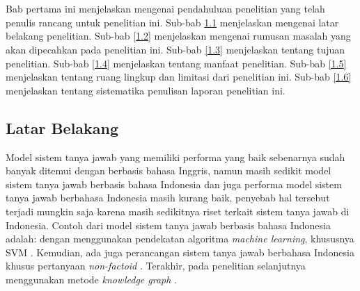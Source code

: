 \chapter{\babSatu}
\label{bab:1}
Bab pertama ini menjelaskan mengenai pendahuluan penelitian yang telah penulis rancang untuk penelitian ini. Sub-bab \ref{1.1} menjelaskan mengenai latar belakang penelitian. Sub-bab \ref{1.2} menjelaskan mengenai rumusan masalah yang akan dipecahkan pada penelitian ini. Sub-bab \ref{1.3} menjelaskan tentang tujuan penelitian. Sub-bab \ref{1.4} menjelaskan tentang manfaat penelitian. Sub-bab \ref{1.5} menjelaskan tentang ruang lingkup dan limitasi dari penelitian ini. Sub-bab \ref{1.6} menjelaskan tentang sistematika penulisan laporan penelitian ini.

\section{Latar Belakang}
\label{1.1}
Model sistem tanya jawab yang memiliki performa yang baik sebenarnya sudah banyak ditemui dengan berbasis bahasa Inggris, namun masih sedikit model sistem tanya jawab berbasis bahasa Indonesia dan juga performa model sistem tanya jawab berbahasa Indonesia masih kurang baik, penyebab hal tersebut terjadi mungkin saja karena masih sedikitnya riset terkait sistem tanya jawab di Indonesia. Contoh dari model sistem tanya jawab berbasis bahasa Indonesia adalah: dengan menggunakan pendekatan algoritma \emph{machine learning}, khususnya SVM \citep{machine-learning-approach}. Kemudian, ada juga perancangan sistem tanya jawab berbahasa Indonesia khusus pertanyaan \emph{non-factoid} \citep{Purwarianti_Yusliani_2012}. Terakhir, pada penelitian selanjutnya menggunakan metode \emph{knowledge graph} \citep{JLK}.

